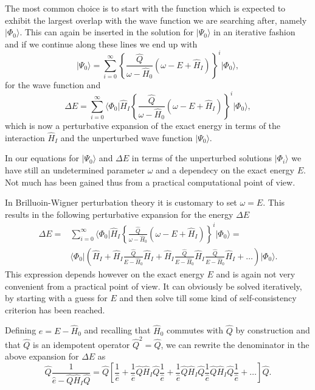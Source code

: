    The most common choice is to start with the function which is
   expected to exhibit the largest overlap with the wave function we
   are searching after, namely $\vert \Phi_0\rangle$. This can again
   be inserted in the solution for $\vert \Psi_0\rangle$ in an
   iterative fashion and if we continue along these lines we end up
   with
  \[
  \vert
  \Psi_0\rangle=\sum_{i=0}^{\infty}\left\{\frac{\hat{Q}}{\omega-\hat{H}_0}\left(\omega-E+\hat{H}_I\right)\right\}^i\vert
  \Phi_0\rangle,
  \]
  for the wave function and
  \[
  \Delta E=\sum_{i=0}^{\infty}\langle \Phi_0\vert
  \hat{H}_I\left\{\frac{\hat{Q}}{\omega-\hat{H}_0}\left(\omega-E+\hat{H}_I\right)\right\}^i\vert
  \Phi_0\rangle,
  \]
  which is now a perturbative expansion of the exact energy in terms
  of the interaction $\hat{H}_I$ and the unperturbed wave function
  $\vert \Psi_0\rangle$.



  In our equations for $\vert \Psi_0\rangle$ and $\Delta E$ in terms
  of the unperturbed solutions $\vert \Phi_i\rangle$ we have still an
  undetermined parameter $\omega$ and a dependecy on the exact energy
  $E$. Not much has been gained thus from a practical computational
  point of view.

  In Brilluoin-Wigner perturbation theory \cite{haxton,shavittbartlett2009} it is customary to set
  $\omega=E$. This results in the following perturbative expansion for
  the energy $\Delta E$
  \begin{align}
  \Delta E=&\sum_{i=0}^{\infty}\langle \Phi_0\vert
  \hat{H}_I\left\{\frac{\hat{Q}}{\omega-\hat{H}_0}\left(\omega-E+\hat{H}_I\right)\right\}^i\vert
  \Phi_0\rangle=\\ &\langle \Phi_0\vert
  \left(\hat{H}_I+\hat{H}_I\frac{\hat{Q}}{E-\hat{H}_0}\hat{H}_I+
  \hat{H}_I\frac{\hat{Q}}{E-\hat{H}_0}\hat{H}_I\frac{\hat{Q}}{E-\hat{H}_0}\hat{H}_I+\dots\right)\vert
  \Phi_0\rangle.
  \end{align}
  This expression depends however on the exact energy $E$ and is again
  not very convenient from a practical point of view. It can obviously
  be solved iteratively, by starting with a guess for $E$ and then
  solve till some kind of self-consistency criterion has been reached.

  Defining $e=E-\hat{H}_0$ and recalling that $\hat{H}_0$ commutes
  with $\hat{Q}$ by construction and that $\hat{Q}$ is an idempotent
  operator $\hat{Q}^2=\hat{Q}$, we can rewrite the denominator in the above
  expansion for $\Delta E$ as
  \[
  \hat{Q}\frac{1}{\hat{e}-\hat{Q}\hat{H}_I\hat{Q}}=\hat{Q}\left[\frac{1}{\hat{e}}+\frac{1}{\hat{e}}\hat{Q}\hat{H}_I\hat{Q}
    \frac{1}{\hat{e}}+\frac{1}{\hat{e}}\hat{Q}\hat{H}_I\hat{Q}
    \frac{1}{\hat{e}}\hat{Q}\hat{H}_I\hat{Q}\frac{1}{\hat{e}}+\dots\right]\hat{Q}.
  \]

